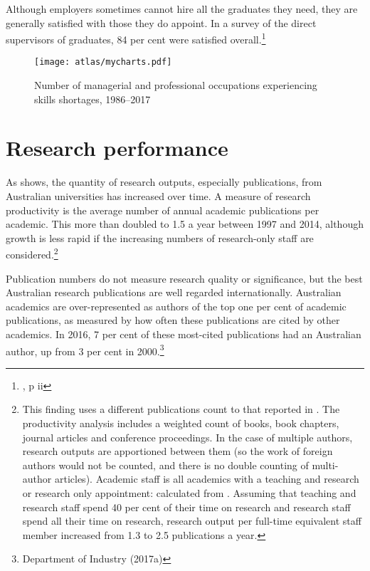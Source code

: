 \documentclass{grattan}
\begin{document}
Although employers sometimes cannot hire all the graduates they need, they are generally satisfied with those they do appoint. In a survey of the direct supervisors of graduates, 84 per cent were satisfied overall.\footnote{\textcite[][]{SocialResearchCentreDepartmentofEducationandTraining20172017employersatis}, p ii}

    \begin{figure} %
    \caption{Number of managerial and professional occupations experiencing skills shortages, 1986--2017}\label{fig:number-of-managerial-and-professional-occupations-experiencing-skills-shortages-19862017}
    \units{}
    \texttt{[image: atlas/mycharts.pdf]}
    \end{figure}
%
\section{Research performance}\label{sec:research-performance}

As  shows, the quantity of research outputs, especially publications, from Australian universities has increased over time. A measure of research productivity is the average number of annual academic publications per academic. This more than doubled to 1.5 a year between 1997 and 2014, although growth is less rapid if the increasing numbers of research-only staff are considered.\footnote{This finding uses a different publications count to that reported in . The productivity analysis includes a weighted count of books, book chapters, journal articles and conference proceedings. In the case of multiple authors, research outputs are apportioned between them (so the work of foreign authors would not be counted, and there is no double counting of multi-author articles). Academic staff is all academics with a teaching and research or research only appointment: calculated from \textcites[][]{DepartmentofEducationandTraining2015staffselectedhig}[][]{DepartmentofEducationandTraining2015researchincomeand}. Assuming that teaching and research staff spend 40 per cent of their time on research and research staff spend all their time on research, research output per full-time equivalent staff member increased from 1.3 to 2.5 publications a year.}

Publication numbers do not measure research quality or significance, but the best Australian research publications are well regarded internationally. Australian academics are over-represented as authors of the top one per cent of academic publications, as measured by how often these publications are cited by other academics. In 2016, 7 per cent of these most-cited publications had an Australian author, up from 3 per cent in 2000.\footnote{Department of Industry (2017a)}
\end{document}
